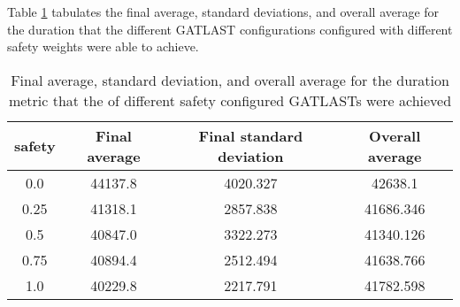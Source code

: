 Table \ref{tab:HP:GA:Safety:duration} tabulates the final average, standard deviations, and overall average for the duration that the different GATLAST configurations configured with different safety weights were able to achieve.
\begin{table}[tbh!]
\centering
\begin{adjustbox}{trim=0cm 0cm 0cm 0cm, clip=true}
\begin{tabular}{|c|c|c|c|}
\hline
safety & Final average & Final standard deviation & Overall average\\
\hline
0.0 & 44137.8 & 4020.327 & 42638.1\\\hline
0.25 & 41318.1 & 2857.838 & 41686.346\\\hline
0.5 & 40847.0 & 3322.273 & 41340.126\\\hline
0.75 & 40894.4 & 2512.494 & 41638.766\\\hline
1.0 & 40229.8 & 2217.791 & 41782.598\\\hline
\end{tabular}
\end{adjustbox}
\caption{Final average, standard deviation, and overall average for the duration metric that the of different safety configured GATLASTs were achieved}
\label{tab:HP:GA:Safety:duration}
\end{table}